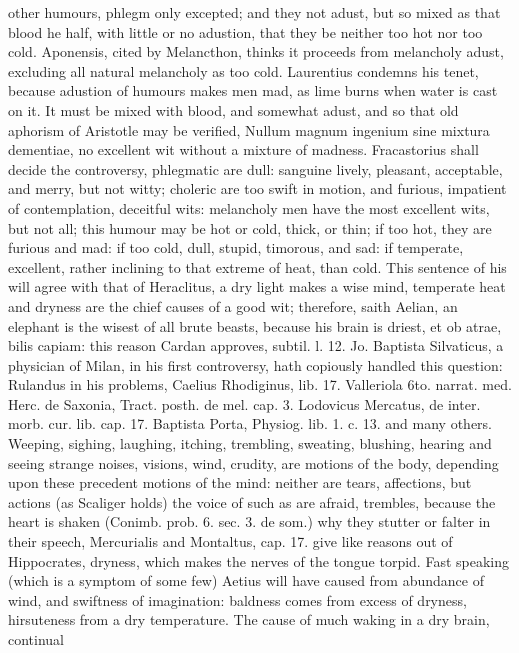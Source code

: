 {other humours, phlegm only excepted; and they not adust, but so
mixed as that blood he half, with little or no adustion, that they be
neither too hot nor too cold. Aponensis, cited by Melancthon, thinks it
proceeds from melancholy adust, excluding all natural melancholy as too
cold. Laurentius condemns his tenet, because adustion of humours makes
men mad, as lime burns when water is cast on it. It must be mixed with
blood, and somewhat adust, and so that old aphorism of Aristotle may be
verified, Nullum magnum ingenium sine mixtura dementiae, no excellent
wit without a mixture of madness. Fracastorius shall decide the
controversy, phlegmatic are dull: sanguine lively, pleasant,
acceptable, and merry, but not witty; choleric are too swift in motion,
and furious, impatient of contemplation, deceitful wits: melancholy men
have the most excellent wits, but not all; this humour may be hot or
cold, thick, or thin; if too hot, they are furious and mad: if too
cold, dull, stupid, timorous, and sad: if temperate, excellent, rather
inclining to that extreme of heat, than cold. This sentence of his will
agree with that of Heraclitus, a dry light makes a wise mind, temperate
heat and dryness are the chief causes of a good wit; therefore, saith
Aelian, an elephant is the wisest of all brute beasts, because his
brain is driest, et ob atrae, bilis capiam: this reason Cardan
approves, subtil. l. 12. Jo. Baptista Silvaticus, a physician of Milan,
in his first controversy, hath copiously handled this question:
Rulandus in his problems, Caelius Rhodiginus, lib. 17. Valleriola 6to.
narrat. med. Herc. de Saxonia, Tract. posth. de mel. cap. 3. Lodovicus
Mercatus, de inter. morb. cur. lib. cap. 17. Baptista Porta, Physiog.
lib. 1. c. 13. and many others.
Weeping, sighing, laughing, itching, trembling, sweating, blushing,
hearing and seeing strange noises, visions, wind, crudity, are motions
of the body, depending upon these precedent motions of the mind:
neither are tears, affections, but actions (as Scaliger holds)
the voice of such as are afraid, trembles, because the heart is
shaken (Conimb. prob. 6. sec. 3. de som.) why they stutter or falter in
their speech, Mercurialis and Montaltus, cap. 17. give like reasons out
of Hippocrates, dryness, which makes the nerves of the tongue
torpid. Fast speaking (which is a symptom of some few) Aetius will have
caused  from abundance of wind, and swiftness of imagination:
baldness comes from excess of dryness, hirsuteness from a dry
temperature. The cause of much waking in a dry brain, continual
}
